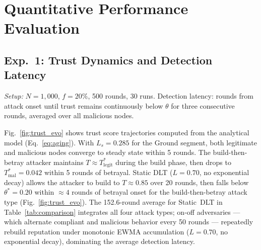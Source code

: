 \documentclass[journal,twoside,10pt]{IEEEtran}
\begin{document}
\section{Quantitative Performance Evaluation}
\label{sec:evaluation}

\subsection{Exp.~1: Trust Dynamics and Detection Latency}

\textit{Setup:} $N\!=\!1{,}000$, $f\!=\!20\%$, 500 rounds, 30 runs.
Detection latency: rounds from attack onset until trust remains
continuously below $\theta$ for three consecutive rounds, averaged
over all malicious nodes.

Fig.~\ref{fig:trust_evo} shows trust score trajectories computed from
the analytical model (Eq.~\eqref{eq:aging}).
With $L_s\!=\!0.285$ for the Ground segment, both legitimate and
malicious nodes converge to steady state within 5 rounds.
The build-then-betray attacker maintains $T\!\approx\!T^*_{\mathrm{legit}}$
during the build phase, then drops to $T^*_{\mathrm{mal}}\!=\!0.042$
within 5 rounds of betrayal.
Static DLT ($L\!=\!0.70$, no exponential decay) allows the attacker
to build to $T\!\approx\!0.85$ over 20 rounds, then falls below
$\theta^*\!=\!0.20$ within $\approx\!4$ rounds of betrayal onset for
the build-then-betray attack type (Fig.~\ref{fig:trust_evo}).
The 152.6-round average for Static~DLT in Table~\ref{tab:comparison}
integrates all four attack types; on-off adversaries --- which alternate
compliant and malicious behavior every 50 rounds --- repeatedly rebuild
reputation under monotonic EWMA accumulation ($L\!=\!0.70$, no
exponential decay), dominating the average detection latency.
\end{document}
